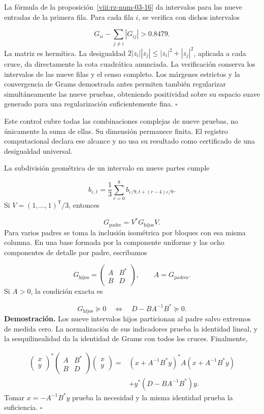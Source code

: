 La fórmula de la proposición~\ref{viii:rz-num-03-16} da intervalos para las nueve entradas de la primera fila. Para cada fila \(i\), se verifica con dichos intervalos

\[
G_{ii}-\sum_{j\neq i}|G_{ij}|>0.8479.
\]
La matriz es hermítica. La desigualdad \(2|z_i||z_j|\leq|z_i|^2+|z_j|^2\), aplicada a cada cruce, da directamente la cota cuadrática anunciada. La verificación conserva los intervalos de las nueve filas y el censo completo. Los márgenes estrictos y la convergencia de Grams demostrada antes permiten también regularizar simultáneamente las nueve pruebas, obteniendo positividad sobre su espacio suave generado para una regularización suficientemente fina. \hfill\(\square\)

Este control cubre todas las combinaciones complejas de nueve pruebas, no únicamente la suma de ellas. Su dimensión permanece finita. El registro computacional declara ese alcance y no usa su resultado como certificado de una desigualdad universal.

La subdivisión geométrica de un intervalo en nueve partes cumple

\[
b_{\varepsilon,t}=\frac13\sum_{r=0}^8
b_{\varepsilon/9,t+(r-4)\varepsilon/9}.
\]
Si \(V=(1,\ldots,1)^{\mathsf T}/3\), entonces

\[
G_{\mathrm{padre}}=V^*G_{\mathrm{hijos}}V.
\]
Para varios padres se toma la inclusión isométrica por bloques con esa misma columna. En una base formada por la componente uniforme y las ocho componentes de detalle por padre, escribamos

\[
G_{\mathrm{hijos}}=
\begin{pmatrix}A&B^*\\B&D\end{pmatrix},\qquad
A=G_{\mathrm{padres}}.
\]
Si \(A>0\), la condición exacta es

\[
G_{\mathrm{hijos}}\succeq0
\quad\Longleftrightarrow\quad D-BA^{-1}B^*\succeq0.
\]
\textbf{Demostración.} Los nueve intervalos hijos particionan al padre salvo extremos de medida cero. La normalización de sus indicadores prueba la identidad lineal, y la sesquilinealidad da la identidad de Grams con todos los cruces. Finalmente,

\[
\begin{aligned}
\begin{pmatrix}x\\y\end{pmatrix}^*
\begin{pmatrix}A&B^*\\B&D\end{pmatrix}
\begin{pmatrix}x\\y\end{pmatrix}
={}&(x+A^{-1}B^*y)^*A(x+A^{-1}B^*y)\\
&+y^*(D-BA^{-1}B^*)y.
\end{aligned}
\]
Tomar \(x=-A^{-1}B^*y\) prueba la necesidad y la misma identidad prueba la suficiencia. \hfill\(\square\)


